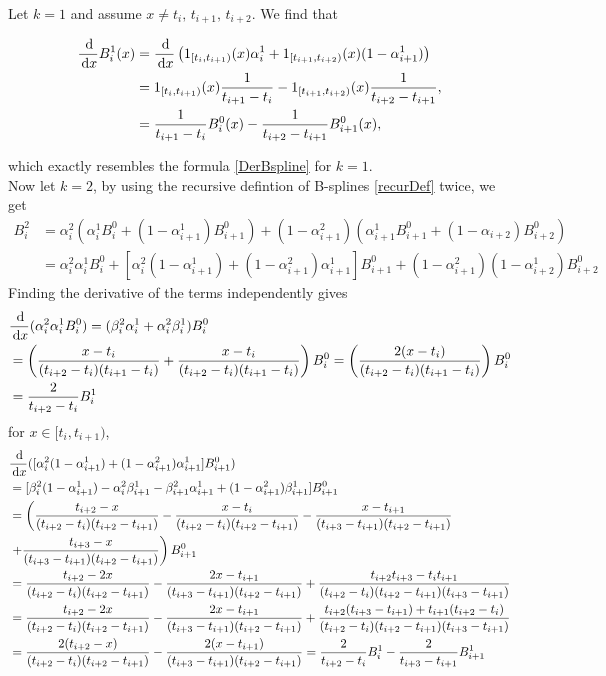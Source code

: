 Let $k=1$ and assume $x\neq t_i,\,t_{i+1},\,t_{i+2}$. We find that

\begin{align}
  \frac{\,{\rm d}}{\,{\rm d} x} B_i^1(x) &= \frac{\,{\rm d}}{\,{\rm d} x} \left(1_{[t_i,t_{i+1})}(x) \alpha_i^1 + 1_{[t_{i+1},t_{i+2})}(x) (1-\alpha_{i+1}^1)\right)\\
  &= 1_{[t_i,t_{i+1})}(x) \frac{1}{t_{i+1}-t_{i}} - 1_{[t_{i+1},t_{i+2})}(x) \frac{1}{t_{i+2}-t_{i+1}},\\
  &= \frac{1}{t_{i+1}-t_{i}}B_i^0(x) - \frac{1}{t_{i+2}-t_{i+1}} B_{i+1}^0(x),
\end{align}

which exactly resembles the formula \eqref{DerBspline} for $k=1$.\\

Now let $k=2$, by using the recursive defintion of B-splines \eqref{recurDef} twice, we get
\begin{align}
  B_i^2 &= \alpha_i^2(\alpha_i^1 B_i^0 + (1-\alpha_{i+1}^1)B_{i+1}^0) + (1-\alpha_{i+1}^2)(\alpha_{i+1}^1B_{i+1}^0 + (1-\alpha_{i+2})B_{i+2}^0)\\
  &= \alpha_i^2\alpha_i^1B_i^0 + [\alpha_i^2(1-\alpha_{i+1}^1) + (1-\alpha_{i+1}^2)\alpha_{i+1}^1]B_{i+1}^0 + (1-\alpha_{i+1}^2)(1-\alpha_{i+2}^1)B_{i+2}^0
\end{align}
Finding the derivative of the terms independently gives
\begin{align}
  &\frac{\,{\rm d}}{\,{\rm d} x} (\alpha_i^2\alpha_i^1B_i^0) = (\beta_i^2\alpha_i^1 + \alpha_i^2\beta_i^1)B_i^0\\
  &= \left(\frac{x-t_i}{(t_{i+2}-t_i)(t_{i+1}-t_i)} + \frac{x-t_i}{(t_{i+2}-t_i)(t_{i+1}-t_i)}\right)B_i^0 = \left(\frac{2(x-t_i)}{(t_{i+2}-t_i)(t_{i+1}-t_i)}\right)B_i^0\\
  & = \frac{2}{t_{i+2}-t_i}B_i^1
\end{align}
for $x\in [t_i,t_{i+1})$, 
\begin{align}
  &\frac{\,{\rm d}}{\,{\rm d} x} ([\alpha_i^2(1-\alpha_{i+1}^1) + (1-\alpha_{i+1}^2)\alpha_{i+1}^1]B_{i+1}^0)\\
  &= [\beta_i^2(1-\alpha_{i+1}^1) - \alpha_i^2\beta_{i+1}^1 - \beta_{i+1}^2\alpha_{i+1}^1 + (1-\alpha_{i+1}^2)\beta_{i+1}^1]B_{i+1}^0\\
  &= \left(\frac{t_{i+2}-x}{(t_{i+2}-t_i)(t_{i+2}-t_{i+1})}-\frac{x-t_i}{(t_{i+2}-t_i)(t_{i+2}-t_{i+1})} - \frac{x-t_{i+1}}{(t_{i+3}-t_{i+1})(t_{i+2}-t_{i+1})}\right.\\
  &\left.+ \frac{t_{i+3}-x}{(t_{i+3}-t_{i+1})(t_{i+2}-t_{i+1})}\right)B_{i+1}^0\\ 
  &= \frac{t_{i+2}-2x}{(t_{i+2}-t_i)(t_{i+2}-t_{i+1})}-\frac{2x-t_{i+1}}{(t_{i+3}-t_{i+1})(t_{i+2}-t_{i+1})} + \frac{t_{i+2}t_{i+3}-t_it_{i+1}}{(t_{i+2}-t_i)(t_{i+2}-t_{i+1})(t_{i+3}-t_{i+1})}\\
  &= \frac{t_{i+2}-2x}{(t_{i+2}-t_i)(t_{i+2}-t_{i+1})}-\frac{2x-t_{i+1}}{(t_{i+3}-t_{i+1})(t_{i+2}-t_{i+1})} + \frac{t_{i+2}(t_{i+3}-t_{i+1}) + t_{i+1}(t_{i+2}-t_i)}{(t_{i+2}-t_i)(t_{i+2}-t_{i+1})(t_{i+3}-t_{i+1})}\\
  &= \frac{2(t_{i+2}-x)}{(t_{i+2}-t_i)(t_{i+2}-t_{i+1})}-\frac{2(x-t_{i+1})}{(t_{i+3}-t_{i+1})(t_{i+2}-t_{i+1})} = \frac{2}{t_{i+2}-t_i} B_i^1 - \frac{2}{t_{i+3}-t_{i+1}} B_{i+1}^1 
\end{align}
